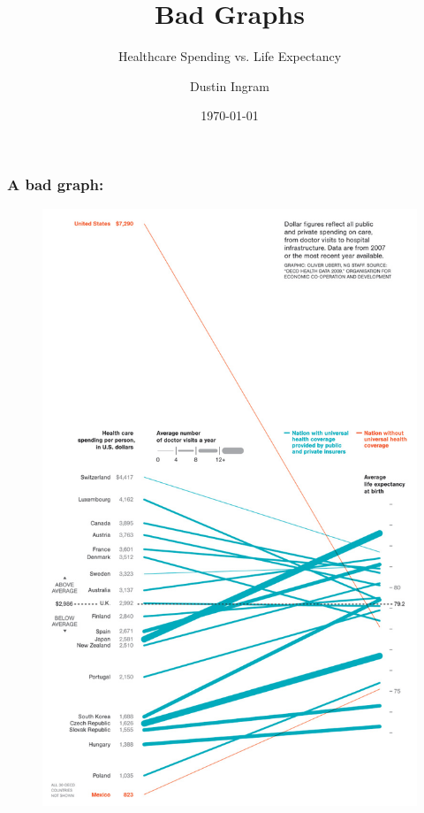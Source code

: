 \documentclass{beamer}
\title{Bad Graphs}
\subtitle{Healthcare Spending vs. Life Expectancy}
\author{Dustin Ingram}
\institute{STAT601, Summer 12-13\\ Drexel University}
\date{\today}
\begin{document}
\maketitle

\begin{frame}
    \frametitle{A bad graph:}
    \begin{figure}
        \centering
        \includegraphics[height=0.8\paperheight]{original.jpg}
    \end{figure}
\end{frame}
\end{document}
